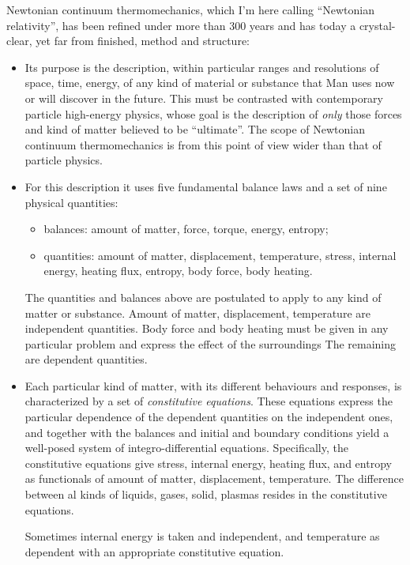 \documentclass[\ifafour a4paper,12pt,\else a5paper,10pt,\fi%
onecolumn,oneside,article,%
british%
]{memoir}
\theoremstyle{remark}
\theoremstyle{innote}
\renewcommand*{\|}[1][]{\nonscript\,#1\vert\nonscript\;\mathopen{}}
\begin{document}
Newtonian continuum thermomechanics, which I'm here calling
\enquote{Newtonian relativity}, has been refined under more than 300 years
and has today a crystal-clear, yet far from finished, method and structure:
\begin{itemize}[para]
\item Its purpose is the description, within particular ranges and
  resolutions of space, time, energy, of any kind of material or substance
  that Man uses now or will discover in the future. This must be contrasted
  with contemporary particle high-energy physics, whose goal is the
  description of \emph{only} those forces and kind of matter believed to be
  \enquote{ultimate}. The scope of Newtonian continuum thermomechanics is
  from this point of view wider than that of particle physics.
\item For this description it uses five fundamental balance laws and a set
  of nine physical quantities:
  \begin{itemize}
  \item balances: amount of matter, force, torque, energy, entropy;
  \item quantities: amount of matter, displacement, temperature, stress,
    internal energy, heating flux, entropy, body force, body heating.
  \end{itemize}
  The quantities and balances above are postulated to apply to any kind of
  matter or substance. Amount of matter, displacement, temperature are independent
  quantities. Body force and body heating must be given in any particular
  problem and express the effect of the surroundings The remaining are
  dependent quantities.
\item Each particular kind of matter, with its different behaviours and
  responses, is characterized by a set of \emph{constitutive equations}.
  These equations express the particular dependence of the dependent
  quantities on the independent ones, and together with the balances and
  initial and boundary conditions yield a well-posed system of
  integro-differential equations. Specifically, the constitutive equations
  give stress, internal energy, heating flux, and entropy as functionals of
  amount of matter, displacement, temperature. The difference between al kinds of
  liquids, gases, solid, plasmas resides in the constitutive equations.
  
  Sometimes internal energy is taken and independent, and temperature as
  dependent with an appropriate constitutive equation.
\end{itemize}
\end{document}
